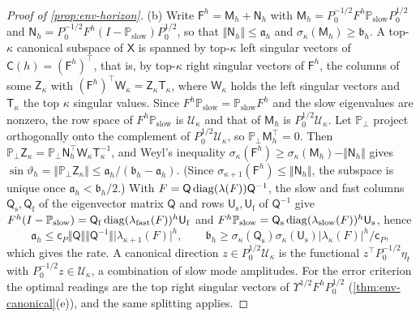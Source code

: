 \begin{proof}[Proof of \cref{prop:env-horizon}]
(b) Write $\mathsf F^h=\mathsf M_h+\mathsf N_h$ with $\mathsf M_h=P_0^{-1/2}F^h\mathbb P_{\mathrm{slow}}P_0^{1/2}$ and $\mathsf N_h=P_0^{-1/2}F^h(I-\mathbb P_{\mathrm{slow}})P_0^{1/2}$, so that $\Vert\mathsf N_h\Vert\le\mathfrak a_h$ and $\sigma_\kappa(\mathsf M_h)\ge\mathfrak b_h$. A top-$\kappa$ canonical subspace of $\mathsf X$ is spanned by top-$\kappa$ left singular vectors of $\mathsf C(h)=(\mathsf F^h)^\top$, that is, by top-$\kappa$ right singular vectors of $\mathsf F^h$, the columns of some $\mathsf Z_\kappa$ with $(\mathsf F^h)^\top\mathsf W_\kappa=\mathsf Z_\kappa\mathsf T_\kappa$, where $\mathsf W_\kappa$ holds the left singular vectors and $\mathsf T_\kappa$ the top $\kappa$ singular values. Since $F^h\mathbb P_{\mathrm{slow}}=\mathbb P_{\mathrm{slow}}F^h$ and the slow eigenvalues are nonzero, the row space of $F^h\mathbb P_{\mathrm{slow}}$ is $\mathcal U_\kappa$ and that of $\mathsf M_h$ is $P_0^{1/2}\mathcal U_\kappa$. Let $\mathbb P_\perp$ project orthogonally onto the complement of $P_0^{1/2}\mathcal U_\kappa$, so $\mathbb P_\perp\mathsf M_h^\top=0$. Then $\mathbb P_\perp\mathsf Z_\kappa=\mathbb P_\perp\mathsf N_h^\top\mathsf W_\kappa\mathsf T_\kappa^{-1}$, and Weyl's inequality $\sigma_\kappa(\mathsf F^h)\ge\sigma_\kappa(\mathsf M_h)-\Vert\mathsf N_h\Vert$ gives $\sin\vartheta_h=\Vert\mathbb P_\perp\mathsf Z_\kappa\Vert\le\mathfrak a_h/(\mathfrak b_h-\mathfrak a_h)$. (Since $\sigma_{\kappa+1}(\mathsf F^h)\le\Vert\mathsf N_h\Vert$, the subspace is unique once $\mathfrak a_h<\mathfrak b_h/2$.) With $F=\mathsf Q\operatorname{diag}(\lambda(F))\mathsf Q^{-1}$, the slow and fast columns $\mathsf Q_{\mathrm s},\mathsf Q_{\mathrm f}$ of the eigenvector matrix $\mathsf Q$ and rows $\mathsf U_{\mathrm s},\mathsf U_{\mathrm f}$ of $\mathsf Q^{-1}$ give $F^h(I-\mathbb P_{\mathrm{slow}})=\mathsf Q_{\mathrm f}\operatorname{diag}(\lambda_{\mathrm{fast}}(F))^h\mathsf U_{\mathrm f}$ and $F^h\mathbb P_{\mathrm{slow}}=\mathsf Q_{\mathrm s}\operatorname{diag}(\lambda_{\mathrm{slow}}(F))^h\mathsf U_{\mathrm s}$, hence
\begin{equation}\label{eq:env-ab-bounds}
\mathfrak a_h\le\mathsf c_P\Vert\mathsf Q\Vert\Vert\mathsf Q^{-1}\Vert\lvert\lambda_{\kappa+1}(F)\rvert^h,\qquad\mathfrak b_h\ge\sigma_\kappa(\mathsf Q_{\mathrm s})\sigma_\kappa(\mathsf U_{\mathrm s})\lvert\lambda_\kappa(F)\rvert^h/\mathsf c_P,
\end{equation}
which gives the rate. A canonical direction $z\in P_0^{1/2}\mathcal U_\kappa$ is the functional $z^\top P_0^{-1/2}\eta_t$ with $P_0^{-1/2}z\in\mathcal U_\kappa$, a combination of slow mode amplitudes. For the error criterion the optimal readings are the top right singular vectors of $\Upsilon^{1/2}F^hP_0^{1/2}$ (\cref{thm:env-canonical}(e)), and the same splitting applies.


\end{proof}
